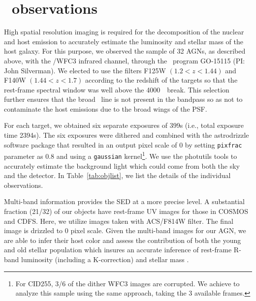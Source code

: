 \documentclass[apj]{emulateapj}
\begin{document}
\section{\hst\ observations}
\label{observation}
High spatial resolution imaging is required for the decomposition of the nuclear and host emission to accurately estimate the luminosity and stellar mass of the host galaxy. For this purpose, we observed the sample of 32 AGNs, as described above, with the \hst/WFC3 infrared channel, through the \hst\ program GO-15115 (PI: John Silverman). We elected to use the filters F125W $(1.2<z<1.44)$ and F140W $(1.44<z<1.7)$ according to the redshift of the targets so that the rest-frame spectral window was well above the 4000~\angstrom\ break. This selection further ensures that the broad \halpha\ line is not present in the bandpass so as not to contaminate the host emissions due to the broad wings of the PSF.

For each target, we obtained six separate exposures of 399s (i.e., total exposure time 2394s). The six exposures were dithered and combined with the {\sc astrodrizzle} software package that resulted in an output pixel scale of 0 by setting \texttt{pixfrac} parameter as 0.8 and using a \texttt{gaussian} kernel\footnote{\label{note1}For CID255, 3/6 of the dither WFC3 images are corrupted. We achieve to analyze this sample using the same approach, taking the 3 available frames.}. We use the {\sc photutils} tools to accurately estimate the background light which could come from both the sky and the detector. In Table~\ref{tab:objlist}, we list the details of the individual observations.

Multi-band information provides the SED at a more precise level. A substantial fraction (21/32) of our objects have rest-frame UV images for those in COSMOS \citep{Koekemoer2007} and CDFS. Here, we utilize images taken with ACS/F814W filter. The final image is drizzled to 0 pixel scale. Given the multi-band images for our AGN, we are able to infer their host color and assess the contribution of both the young and old stellar population which insures an accurate inference of rest-frame R-band luminosity (including a K-correction) and stellar mass \citep{Gallazzi2009}. 
\end{document}
